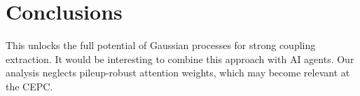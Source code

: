 \section{Conclusions}\label{sec:conclusions}

This unlocks the full potential of Gaussian processes for strong
coupling extraction. It would be interesting to combine this approach
with AI agents. Our analysis neglects pileup-robust attention weights,
which may become relevant at the CEPC.

